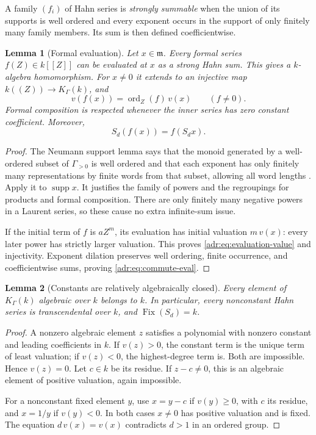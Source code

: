 \documentclass[11pt,letterpaper]{article}
\numberwithin{equation}{section}
\newtheorem{lemma}[lemma]{Lemma}
\theoremstyle{definition}
\theoremstyle{remark}
\newcommand{\K}{K_\Gamma(k)}
\newcommand{\supp}{\operatorname{supp}}
\newcommand{\ord}{\operatorname{ord}}
\begin{document}
A family $(f_i)$ of Hahn series is \emph{strongly summable} when the union
of its supports is well ordered and every exponent occurs in the support
of only finitely many family members. Its sum is then defined coefficientwise.

\begin{lemma}[Formal evaluation]\label{adr:lem:evaluation}
Let $x\in\mathfrak m$. Every formal series $f(Z)\in k[[Z]]$ can be evaluated
at $x$ as a strong Hahn sum. This gives a $k$-algebra homomorphism.
For $x\ne0$ it extends to an injective map $k((Z))\to\K$, and
\begin{equation}\label{adr:eq:evaluation-value}
 v(f(x))=\ord_Z(f)\,v(x)\qquad(f\ne0).
\end{equation}
Formal composition is respected whenever the inner series has zero
constant coefficient. Moreover,
\begin{equation}\label{adr:eq:commute-eval}
 S_d(f(x))=f(S_dx).
\end{equation}
\end{lemma}
\begin{proof}
The Neumann support lemma says that the monoid generated by a well-ordered
subset of $\Gamma_{>0}$ is well ordered and that each exponent has only
finitely many representations by finite words from that subset, allowing
all word lengths \cite{Neumann}. Apply it to $\supp x$. It justifies the
family of powers and the regroupings for products and formal composition.
There are only finitely many negative powers in a Laurent series, so these
cause no extra infinite-sum issue.

If the initial term of $f$ is $aZ^m$, its evaluation has initial valuation
$m\,v(x)$: every later power has strictly larger valuation. This proves
\eqref{adr:eq:evaluation-value} and injectivity. Exponent dilation preserves
well ordering, finite occurrence, and coefficientwise sums, proving
\eqref{adr:eq:commute-eval}.
\end{proof}

\begin{lemma}[Constants are relatively algebraically closed]
\label{adr:lem:constants}
Every element of $\K$ algebraic over $k$ belongs to $k$. In particular,
every nonconstant Hahn series is transcendental over $k$, and
$\operatorname{Fix}(S_d)=k$.
\end{lemma}
\begin{proof}
A nonzero algebraic element $z$ satisfies a polynomial with nonzero
constant and leading coefficients in $k$. If $v(z)>0$, the constant term
is the unique term of least valuation; if $v(z)<0$, the highest-degree
term is. Both are impossible. Hence $v(z)=0$. Let $c\in k$ be its
residue. If $z-c\ne0$, this is an algebraic element of positive valuation,
again impossible.

For a nonconstant fixed element $y$, use $x=y-c$ if $v(y)\ge0$, with
$c$ its residue, and $x=1/y$ if $v(y)<0$. In both cases $x\ne0$ has
positive valuation and is fixed. The equation $d\,v(x)=v(x)$ contradicts
$d>1$ in an ordered group.
\end{proof}
\end{document}
